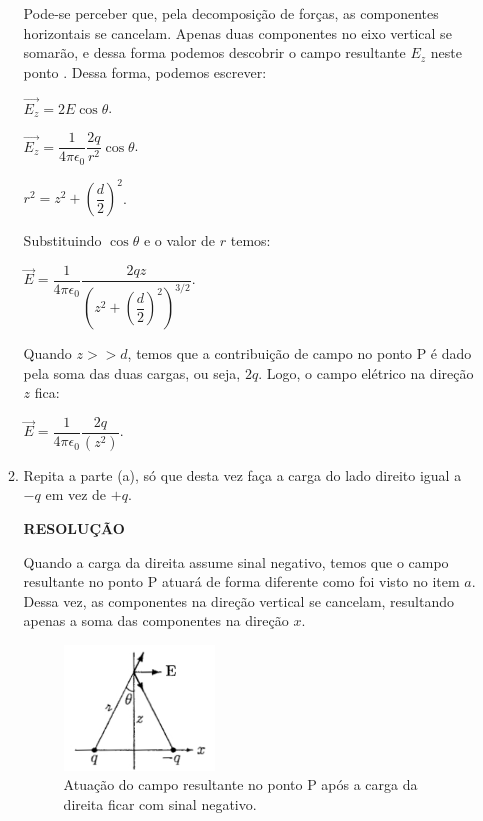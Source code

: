 \documentclass[11pt,a4paper]{article}
\begin{document}
\begin{enumerate}
\begin{enumerate}
Pode-se perceber que, pela decomposição de forças, as componentes horizontais se cancelam. Apenas duas componentes no eixo vertical se somarão, e dessa forma podemos descobrir o campo resultante $E_z$ neste ponto . Dessa forma, podemos escrever:


\begin{center}

$\vec{E_z} = 2 E\cos \theta$.

$\vec{E_z} = \displaystyle\dfrac{1}{4 \pi \epsilon_0} \displaystyle\dfrac{2q}{r^2}\cos \theta $.

$r^2 = z^2 + \left(\displaystyle\dfrac{d}{2}\right)^2$.

\end{center}

Substituindo $\cos \theta$ e o valor de $r$ temos:

\begin{center}
$\vec{E} = \displaystyle\dfrac{1}{4 \pi \epsilon_0} \displaystyle\dfrac{2qz}{\left(z^2 + \left(\displaystyle\dfrac{d}{2}\right)^2\right)^{3/2}}$.
\end{center}

Quando $z >> d$, temos que a contribuição de campo no ponto P é dado pela soma das duas cargas, ou seja, $2q$. Logo, o campo elétrico na direção $z$ fica:

\begin{center}
$\vec{E} = \displaystyle\dfrac{1}{4 \pi \epsilon_0} \displaystyle\dfrac{2q}{\left(z^2\right)}$.
\end{center}

\item Repita a parte (a), só que desta vez faça a carga do lado direito igual a $-q$ em vez de $+q$.

\textbf{RESOLUÇÃO}

Quando a carga da direita assume sinal negativo, temos que o campo resultante no ponto P atuará de forma diferente como foi visto no item $a$. Dessa vez, as componentes na direção vertical se cancelam, resultando apenas a soma das componentes na direção $x$.

\begin{figure}[h]	
\centering %
\includegraphics[width=4cm]{Selection_074.jpg} 
\caption{Atuação do campo resultante no ponto P após a carga da direita ficar com sinal negativo.}
\end{figure}


\end{enumerate}
\end{enumerate}
\end{document}

